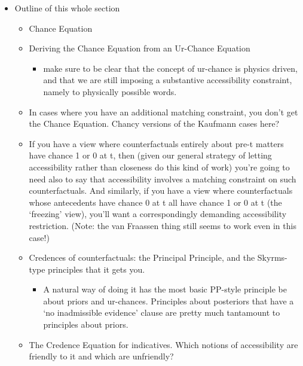 \documentclass[If.tex]{subfiles}
\begin{document}
\begin{itemize}
\item
  Outline of this whole section

  \begin{itemize}
  \item
    Chance Equation
  \item
    Deriving the Chance Equation from an Ur-Chance Equation

    \begin{itemize}
        \item
      make sure to be clear that the concept of ur-chance is physics
      driven, and that we are still imposing a substantive accessibility
      constraint, namely to physically possible words.
    \end{itemize}
  \item
    In cases where you have an additional matching constraint, you don't
    get the Chance Equation. Chancy versions of the Kaufmann cases here?
  \item
    If you have a view where counterfactuals entirely about pre-t
    matters have chance 1 or 0 at t, then (given our general strategy of
    letting accessibility rather than closeness do this kind of work)
    you're going to need also to say that accessibility involves a
    matching constraint on such counterfactuals. And similarly, if you
    have a view where counterfactuals whose antecedents have chance 0 at
    t all have chance 1 or 0 at t (the ‘freezing’ view), you'll want a
    correspondingly demanding accessibility restriction. (Note: the van
    Fraassen thing still seems to work even in this case!)
  \item
    Credences of counterfactuals: the Principal Principle, and the
    Skyrms-type principles that it gets you.

    \begin{itemize}
        \item
      A natural way of doing it has the most basic PP-style principle be
      about priors and ur-chances. Principles about posteriors that have
      a ‘no inadmissible evidence’ clause are pretty much tantamount to
      principles about priors.
    \end{itemize}
  \item
    The Credence Equation for indicatives. Which notions of
    accessibility are friendly to it and which are unfriendly?


\end{itemize}
\end{itemize}
\end{document}
